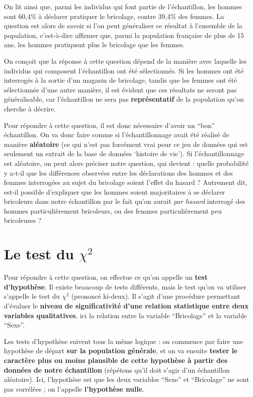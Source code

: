 \documentclass[
]{book}
\begin{document}
On lit ainsi que, parmi les individus qui font partie de l'échantillon, les hommes sont 60,4\% à déclarer pratiquer le bricolage, contre 39,4\% des femmes. La question est alors de savoir si l'on peut généraliser ce résultat à l'ensemble de la population, c'est-à-dire affirmer que, parmi la population française de plus de 15 ans, les hommes pratiquent plus le bricolage que les femmes.

On conçoit que la réponse à cette question dépend de la manière avec laquelle les individus qui composent l'échantillon ont été sélectionnés. Si les hommes ont été interrogés à la sortie d'un magasin de bricolage, tandis que les femmes ont été sélectionnée d'une autre manière, il est évident que ces résultats ne seront pas généralisable, car l'échantillon ne sera pas \textbf{représentatif} de la population qu'on cherche à décrire.

Pour répondre à cette question, il est donc nécessaire d'avoir un ``bon'' échantillon. On va donc faire comme si l'échantillonnage avait été réalisé de manière \textbf{aléatoire} (ce qui n'est pas forcément vrai pour ce jeu de données qui est seulement un extrait de la base de données `histoire de vie'). Si l'échantillonnage est aléatoire, on peut alors préciser notre question, qui devient : quelle probabilité y a-t-il que les différences observées entre les déclarations des hommes et des femmes interrogées au sujet du bricolage soient l'effet du hasard ? Autrement dit, est-il possible d'expliquer que les hommes soient majoritaires à se déclarer bricoleurs dans notre échantillon par le fait qu'on aurait \emph{par hasard} interrogé des hommes particulièrement bricoleurs, ou des femmes particulièrement peu bricoleuses ?

\hypertarget{le-test-du-chi2}{%
\section{\texorpdfstring{Le test du \(\chi^2\)}{Le test du \textbackslash chi\^{}2}}\label{le-test-du-chi2}}

Pour répondre à cette question, on effectue ce qu'on appelle un \textbf{test d'hypothèse}. Il existe beaucoup de tests différents, mais le test qu'on va utiliser s'appelle le test du \(\chi^2\) (prononcé ki-deux). Il s'agit d'une procédure permettant d'évaluer le \textbf{niveau de significativité d'une relation statistique entre deux variables qualitatives}, ici la relation entre la variable ``Bricolage'' et la variable ``Sexe''.

Les tests d'hypothèse suivent tous la même logique : on commence par faire une hypothèse de départ \textbf{sur la population générale}, et on va ensuite \textbf{tester le caractère plus ou moins plausible de cette hypothèse à partir des données de notre échantillon} (répétons qu'il doit s'agir d'un échantillon aléatoire). Ici, l'hypothèse est que les deux variables ``Sexe'' et ``Bricolage'' ne sont pas corrélées ; on l'appelle \textbf{l'hypothèse nulle}.
\end{document}
